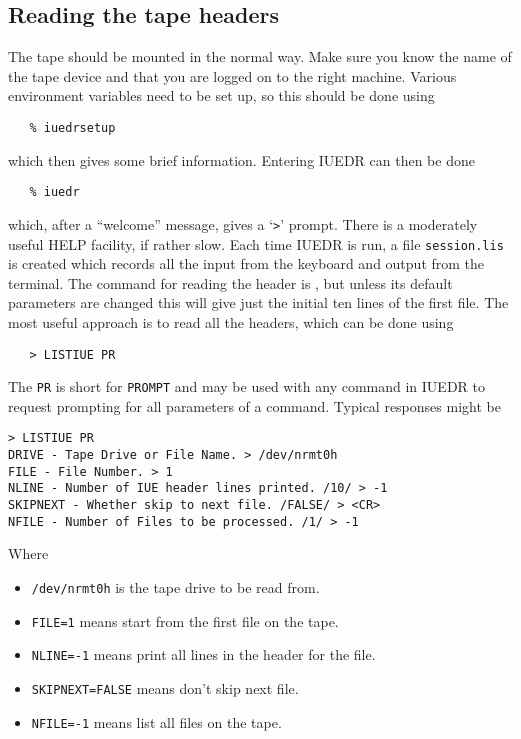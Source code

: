 \subsection{Reading the tape headers}

The tape should be mounted in the normal way. Make sure you know the name
of the tape device and that you are logged on to the right machine.
Various environment variables need to be set up, so this should be done using

\begin{verbatim}
   % iuedrsetup
\end{verbatim}

which then gives some brief information. Entering IUEDR can then be done

\begin{verbatim}
   % iuedr
\end{verbatim}

which, after a ``welcome'' message, gives a `\verb+>+' prompt.
There is a moderately useful HELP facility, if rather slow. Each time IUEDR
is run, a file \verb+session.lis+ is created which records all the input from
the keyboard and output from the terminal. The command for reading the header
is , but unless its default parameters are
changed this will give just the initial ten lines of the first file.
The most useful approach is to read all the headers, which can be done using

\begin{verbatim}
   > LISTIUE PR
\end{verbatim}

The \verb+PR+ is short for \verb+PROMPT+ and may be used with any command in
IUEDR to request prompting for all parameters of a command.  Typical responses
might be

\begin{verbatim}
> LISTIUE PR
DRIVE - Tape Drive or File Name. > /dev/nrmt0h
FILE - File Number. > 1
NLINE - Number of IUE header lines printed. /10/ > -1
SKIPNEXT - Whether skip to next file. /FALSE/ > <CR>
NFILE - Number of Files to be processed. /1/ > -1
\end{verbatim}

Where

\begin{itemize}
\item \verb+/dev/nrmt0h+ is the tape drive to be read from.
\item \verb+FILE=1+ means start from the first file on the tape.
\item \verb+NLINE=-1+ means print all lines in the header for the file.
\item \verb+SKIPNEXT=FALSE+ means don't skip next file.
\item \verb+NFILE=-1+ means list all files on the tape.
\end{itemize}

